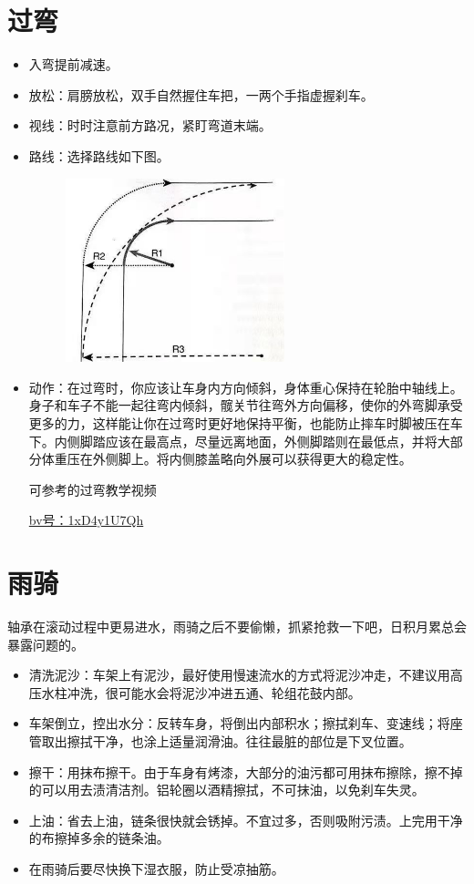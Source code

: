 \documentclass{ctexbook}
\begin{document}
\section{过弯}
\begin{itemize}
\item 入弯提前减速。
\item 放松：肩膀放松，双手自然握住车把，一两个手指虚握刹车。
\item 视线：时时注意前方路况，紧盯弯道末端。 
\item 路线：选择路线如下图。
       \begin{figure}[H]
            \begin{center}
            \includegraphics[width=0.6\textwidth]{fig/过弯}
            \end{center}
        \end{figure}
\item 动作：在过弯时，你应该让车身内方向倾斜，身体重心保持在轮胎中轴线上。身子和车子不能一起往弯内倾斜，髋关节往弯外方向偏移，使你的外弯脚承受更多的力，这样能让你在过弯时更好地保持平衡，也能防止摔车时脚被压在车下。内侧脚踏应该在最高点，尽量远离地面，外侧脚踏则在最低点，并将大部分体重压在外侧脚上。将内侧膝盖略向外展可以获得更大的稳定性。

可参考的过弯教学视频 

\href{https://www.bilibili.com/video/BV1xD4y1U7Qh}{bv号：1xD4y1U7Qh}
\end{itemize}

\section{雨骑}
轴承在滚动过程中更易进水，雨骑之后不要偷懒，抓紧抢救一下吧，日积月累总会暴露问题的。
\begin{itemize}
\item 清洗泥沙：车架上有泥沙，最好使用慢速流水的方式将泥沙冲走，不建议用高压水柱冲洗，很可能水会将泥沙冲进五通、轮组花鼓内部。
\item 车架倒立，控出水分：反转车身，将倒出内部积水；擦拭刹车、变速线；将座管取出擦拭干净，也涂上适量润滑油。往往最脏的部位是下叉位置。 
\item 擦干：用抹布擦干。由于车身有烤漆，大部分的油污都可用抹布擦除，擦不掉的可以用去渍清洁剂。铝轮圈以酒精擦拭，不可抹油，以免刹车失灵。
\item 上油：省去上油，链条很快就会锈掉。不宜过多，否则吸附污渍。上完用干净的布擦掉多余的链条油。
\item 在雨骑后要尽快换下湿衣服，防止受凉抽筋。
\end{itemize}
\end{document}
